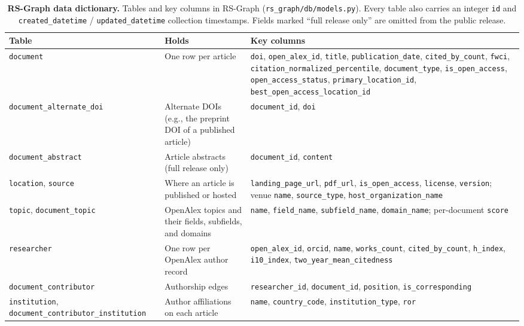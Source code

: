 \documentclass[pdflatex,sn-nature]{sn-jnl}%
\begin{document}
\begin{table}[p]
\caption{\textbf{RS-Graph data dictionary.} Tables and key columns in RS-Graph (\texttt{rs\_graph/db/models.py}). Every table also carries an integer \texttt{id} and \texttt{created\_datetime} / \texttt{updated\_datetime} collection timestamps. Fields marked ``full release only'' are omitted from the public release.}\label{stab:dictionary}
\footnotesize
\setlength{\tabcolsep}{4pt}
\begin{tabular}{@{}>{\raggedright\arraybackslash}p{94pt}>{\raggedright\arraybackslash}p{92pt}>{\raggedright\arraybackslash}p{170pt}@{}}
\toprule
Table & Holds & Key columns \\
\midrule
\texttt{document} & One row per article & \texttt{doi}, \texttt{open\_alex\_id}, \texttt{title}, \texttt{publication\_date}, \texttt{cited\_by\_count}, \texttt{fwci}, \texttt{citation\_normalized\_percentile}, \texttt{document\_type}, \texttt{is\_open\_access}, \texttt{open\_access\_status}, \texttt{primary\_location\_id}, \texttt{best\_open\_access\_location\_id} \\
\texttt{document\_alternate\_doi} & Alternate DOIs (e.g., the preprint DOI of a published article) & \texttt{document\_id}, \texttt{doi} \\
\texttt{document\_abstract} & Article abstracts (full release only) & \texttt{document\_id}, \texttt{content} \\
\texttt{location}, \texttt{source} & Where an article is published or hosted & \texttt{landing\_page\_url}, \texttt{pdf\_url}, \texttt{is\_open\_access}, \texttt{license}, \texttt{version}; venue \texttt{name}, \texttt{source\_type}, \texttt{host\_organization\_name} \\
\texttt{topic}, \texttt{document\_topic} & OpenAlex topics and their fields, subfields, and domains & \texttt{name}, \texttt{field\_name}, \texttt{subfield\_name}, \texttt{domain\_name}; per-document \texttt{score} \\
\texttt{researcher} & One row per OpenAlex author record & \texttt{open\_alex\_id}, \texttt{orcid}, \texttt{name}, \texttt{works\_count}, \texttt{cited\_by\_count}, \texttt{h\_index}, \texttt{i10\_index}, \texttt{two\_year\_mean\_citedness} \\
\texttt{document\_contributor} & Authorship edges & \texttt{researcher\_id}, \texttt{document\_id}, \texttt{position}, \texttt{is\_corresponding} \\
\texttt{institution}, \texttt{document\_contributor\_\allowbreak institution} & Author affiliations on each article & \texttt{name}, \texttt{country\_code}, \texttt{institution\_type}, \texttt{ror} \\

\end{tabular}
\end{table}
\end{document}

